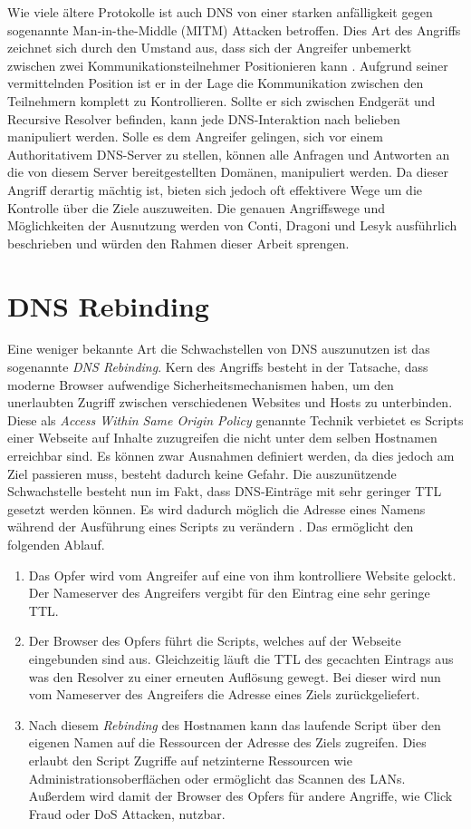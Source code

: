 Wie viele ältere Protokolle ist auch DNS von einer starken anfälligkeit gegen sogenannte Man-in-the-Middle (MITM) Attacken betroffen. Dies Art des Angriffs zeichnet sich durch den Umstand aus, dass sich der Angreifer unbemerkt zwischen zwei Kommunikationsteilnehmer Positionieren kann \cite{CAPEC94}. Aufgrund seiner vermittelnden Position ist er in der Lage die Kommunikation zwischen den Teilnehmern komplett zu Kontrollieren. Sollte er sich zwischen Endgerät und Recursive Resolver befinden, kann jede DNS-Interaktion nach belieben manipuliert werden. Solle es dem Angreifer gelingen, sich vor einem Authoritativem DNS-Server zu stellen, können alle Anfragen und Antworten an die von diesem Server bereitgestellten Domänen, manipuliert werden. 
Da dieser Angriff derartig mächtig ist, bieten sich jedoch oft effektivere Wege um die Kontrolle über die Ziele auszuweiten. Die genauen Angriffswege und Möglichkeiten der Ausnutzung werden von Conti, Dragoni und Lesyk \cite{Conti2016} ausführlich beschrieben und würden den Rahmen dieser Arbeit sprengen.

\section{DNS Rebinding}
\label{sec:attack-dnsrebind}

Eine weniger bekannte Art die Schwachstellen von DNS auszunutzen ist das sogenannte \textit{DNS Rebinding}. Kern des Angriffs besteht in der Tatsache, dass moderne Browser aufwendige Sicherheitsmechanismen haben, um den unerlaubten Zugriff zwischen verschiedenen Websites und Hosts zu unterbinden. Diese als \textit{Access Within Same Origin Policy} genannte Technik verbietet es Scripts einer Webseite auf Inhalte zuzugreifen die nicht unter dem selben Hostnamen erreichbar sind. Es können zwar Ausnahmen definiert werden, da dies jedoch am Ziel passieren muss, besteht dadurch keine Gefahr. Die auszunützende Schwachstelle besteht nun im Fakt, dass DNS-Einträge mit sehr geringer TTL gesetzt werden können. Es wird dadurch möglich die Adresse eines Namens während der Ausführung eines Scripts zu verändern \cite{Jackson2009}. Das ermöglicht den folgenden Ablauf.

\begin{enumerate}
    \item Das Opfer wird vom Angreifer auf eine von ihm kontrolliere Website gelockt. Der Nameserver des Angreifers vergibt für den Eintrag eine sehr geringe TTL.
    \item Der Browser des Opfers führt die Scripts, welches auf der Webseite eingebunden sind aus. Gleichzeitig läuft die TTL des gecachten Eintrags aus was den Resolver zu einer erneuten Auflösung gewegt. Bei dieser wird nun vom Nameserver des Angreifers die Adresse eines Ziels zurückgeliefert.
    \item Nach diesem \textit{Rebinding} des Hostnamen kann das laufende Script über den eigenen Namen auf die Ressourcen der Adresse des Ziels zugreifen. Dies erlaubt den Script Zugriffe auf netzinterne Ressourcen wie Administrationsoberflächen oder ermöglicht das Scannen des LANs. Außerdem wird damit der Browser des Opfers für andere Angriffe, wie Click Fraud oder DoS Attacken, nutzbar.   
\end{enumerate}

